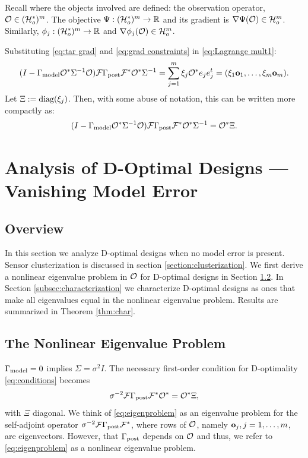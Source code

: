 \documentclass{amsart}
\numberwithin{equation}{section}
\begin{document}
Recall where the objects involved are defined: the observation
operator, $\mathcal{O} \in (\mathcal{H}_o^*)^m$. The objective $\Psi: (\mathcal{H}_o^*)^m \to
\mathbb{R}$ and its gradient is $\nabla \Psi(\mathcal{O}) \in \mathcal{H}_o^m$. Similarly,
$\phi_j: (\mathcal{H}_o^*)^m \to \mathbb{R}$ and $\nabla \phi_j(\mathcal{O}) \in \mathcal{H}_o^m$.

Substituting \eqref{eq:tar grad} and \eqref{eq:grad constraints} in
\eqref{eq:Lagrange mult1}:
\begin{equation*}
  (I - \Gamma_{\textup{model}} \mathcal{O}^* \Sigma^{-1} \mathcal{O}) \mathcal{F} \Gamma_{\textup{post}} \mathcal{F}^* \mathcal{O}^*\Sigma^{-1}
  = \sum_{j=1}^m \xi_j \mathcal{O}^* e_je_j^t = (\xi_1 \mathbf{o}_1,\dots,\xi_m \mathbf{o}_m).
\end{equation*}
Let $\Xi := \textup{diag}(\xi_j)$. Then, with some abuse of notation, this can
be written more compactly as:
\begin{equation}\label{eq:conditions}
  ( I - \Gamma_{\textup{model}} \mathcal{O}^* \Sigma^{-1} \mathcal{O}) \mathcal{F} \Gamma_{\textup{post}} \mathcal{F}^* \mathcal{O}^*  \Sigma^{-1}
  = \mathcal{O}^* \Xi.
\end{equation}



\section{Analysis of D-Optimal Designs --- Vanishing Model Error}\label{section:vanishing}
\subsection{Overview}
In this section we analyze D-optimal designs when no model error is
present. Sensor clusterization is discussed in section
\ref{section:clusterization}. We first derive a nonlinear eigenvalue
problem in $\mathcal{O}$ for D-optimal designs in Section
\ref{subsec:eigenproblem}. In Section \ref{subsec:characterization} we
characterize D-optimal designs as ones that make all eigenvalues equal
in the nonlinear eigenvalue problem. Results are summarized in Theorem
\ref{thm:char}.


\subsection{The Nonlinear Eigenvalue Problem}\label{subsec:eigenproblem}
$\Gamma_{\textup{model}} = 0$ implies $\Sigma= \sigma^2I$. The necessary first-order
condition for D-optimality \eqref{eq:conditions} becomes
\begin{equation}\label{eq:eigenproblem}
  \sigma^{-2}\mathcal{F} \Gamma_{\textup{post}} \mathcal{F}^* \mathcal{O}^* = \mathcal{O}^* \Xi,
\end{equation}
with $\Xi$ diagonal. We think of \eqref{eq:eigenproblem} as an
eigenvalue problem for the self-adjoint operator $\sigma^{-2}\mathcal{F}
\Gamma_{\textup{post}} \mathcal{F}^*$, where rows of $\mathcal{O}$, namely $\mathbf{o}_j,j=1,\dots, m$,
are eigenvectors. However, that $\Gamma_{\textup{post}}$ depends on $\mathcal{O}$ and thus,
we refer to \eqref{eq:eigenproblem} as a nonlinear eigenvalue problem.
\end{document}
